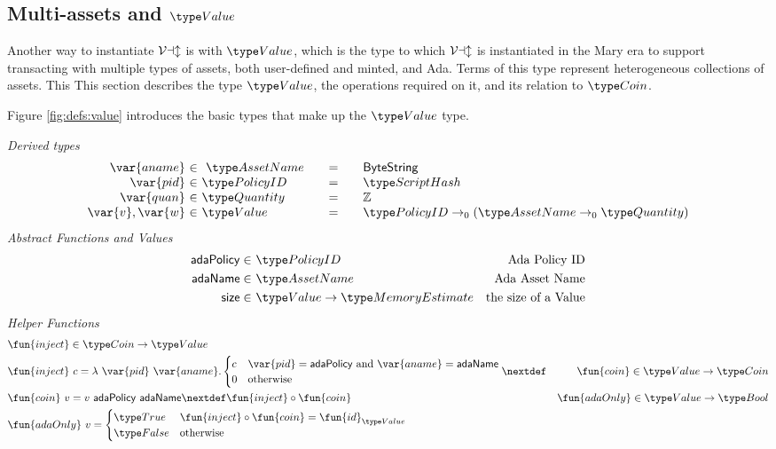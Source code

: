 \subsection{Multi-assets and $\Value$}

Another way to instantiate $\mathcal{Val}$ is with $\Value$, which is the type to which
$\mathcal{Val}$ is instantiated in the Mary era to support transacting with
multiple types of assets, both user-defined and minted, and Ada. Terms of this
type represent heterogeneous collections of assets. This
This section describes the type $\Value$, the operations required on
it, and its relation to $\Coin$.

Figure \ref{fig:defs:value} introduces the basic types that make up the $\Value$ type.

\begin{figure*}[t!]
  \emph{Derived types}
  \begin{equation*}
    \begin{array}{r@{~\in~}l@{\qquad=\qquad}lr}
      \var{aname} & ~\AssetName & \mathsf{ByteString} \\
      \var{pid} & \PolicyID & \ScriptHash \\
      \var{quan} & \Quantity & \Z \\
      \var{v}, \var{w} & \Value
      & \PolicyID \to_0 ( \AssetName \to_0 \Quantity )
    \end{array}
  \end{equation*}
  \emph{Abstract Functions and Values}
  \begin{align*}
    \mathsf{adaPolicy} \in& ~\PolicyID & \text{Ada Policy ID} \\
    \mathsf{adaName} \in& ~\AssetName & \text{Ada Asset Name} \\
    \mathsf{size} \in& ~\Value\to\MemoryEstimate & \text{the size of a Value}
  \end{align*}
  \emph{Helper Functions}
  \begin{align*}
    & \fun{inject} \in \Coin\to \Value \\
    & \fun{inject}~c = \lambda~\var{pid}~\var{aname}.
      \begin{cases}
        c & \var{pid} = \mathsf{adaPolicy}~\text{and}~\var{aname} = \mathsf{adaName} \\
        0 & \text{otherwise}
      \end{cases}
    \nextdef
    & \fun{coin} \in \Value \to \Coin \\
    & \fun{coin}~v = v~\mathsf{adaPolicy}~\mathsf{adaName}
    \nextdef \fun{inject} \circ \fun{coin}
    & \fun{adaOnly} \in \Value \to \Bool \\
    & \fun{adaOnly}~v =
      \begin{cases}
        \True & \fun{inject} \circ \fun{coin} = \fun{id}_{\Value} \\
        \False & \text{otherwise}
      \end{cases}
  \end{align*}
  \caption{Type Definitions and auxiliary functions for Value}
  \label{fig:defs:value}
\end{figure*}

